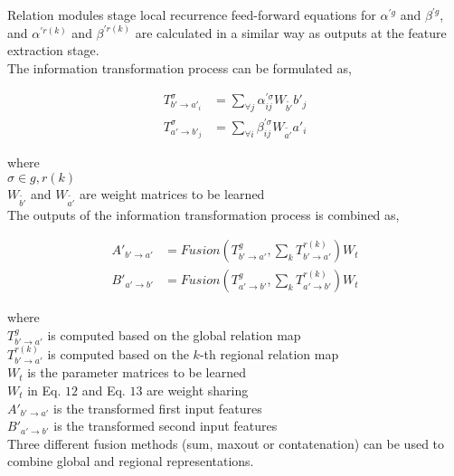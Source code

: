 \documentclass{article}
\begin{document}
\noindent Relation modules stage local recurrence feed-forward equations for $\alpha^{'g}$ and $\beta^{'g}$, and $\alpha^{'r(k)}$ and $\beta^{'r(k)}$ are calculated in a similar way as outputs at the feature extraction stage. \\

\noindent The information transformation process can be formulated as,

\begin{align}
T_{b'\rightarrow a'_{i}}^{\sigma} &= \sum_{\forall j}\alpha_{ij}^{'\sigma}W_{\tilde{b'}}b'_{j} \\
T_{a'\rightarrow b'_{j}}^{\sigma} &= \sum_{\forall i}\beta_{ij}^{'\sigma}W_{\tilde{a'}}a'_{i}
\end{align}

where \\

\indent\indent $\sigma \in {g, r(k)}$ \\
\indent\indent $W_{\tilde{b'}}$ and $W_{\tilde{a'}}$ are weight matrices to be learned \\

The outputs of the information transformation process is combined as,

\begin{align}
A'_{b'\rightarrow a'} &= Fusion\left(T_{b'\rightarrow a'}^{g}, \sum_{k}T_{b'\rightarrow a'}^{r(k)}\right)W_{t} \\
B'_{a'\rightarrow b'} &= Fusion\left(T_{a'\rightarrow b'}^{g}, \sum_{k}T_{a'\rightarrow b'}^{r(k)}\right)W_{t}
\end{align}

where \\

\indent\indent $T_{b'\rightarrow a'}^{g}$ is computed based on the global relation map \\
\indent\indent $T_{b'\rightarrow a'}^{r(k)}$ is computed based on the $k$-th regional relation map \\
\indent\indent $W_{t}$ is the parameter matrices to be learned \\
\indent\indent $W_{t}$ in Eq. $12$ and Eq. $13$ are weight sharing \\
\indent\indent $A'_{b'\rightarrow a'}$ is the transformed first input features \\
\indent\indent $B'_{a'\rightarrow b'}$ is the transformed second input features \\

\noindent Three different fusion methods (sum, maxout or contatenation) can be used to combine global and regional representations. \\
\end{document}

